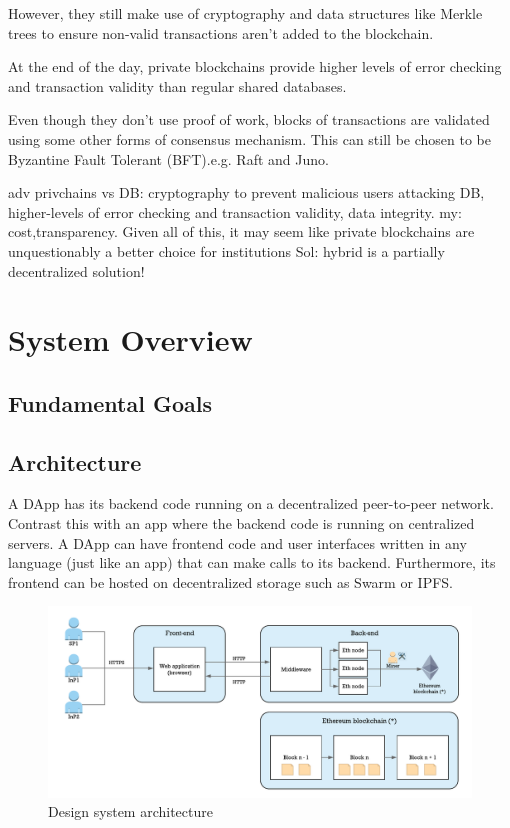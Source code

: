 However, they still make use of cryptography and data structures like Merkle trees to ensure non-valid transactions aren’t added to the blockchain. 

At the end of the day, private blockchains provide higher levels of error checking and transaction validity than regular shared databases. 

Even though they don’t use proof of work, blocks of transactions are validated using some other forms of consensus mechanism. This can still be chosen to be Byzantine Fault Tolerant (BFT).e.g. Raft and Juno.

adv privchains vs DB: cryptography to prevent malicious users attacking DB, higher-levels of error checking and transaction validity, data integrity.
my: cost,transparency.
Given all of this, it may seem like private blockchains are unquestionably a better choice for institutions
Sol: hybrid is a partially decentralized solution!
\section{System Overview}

\subsection{Fundamental Goals}

\subsection{Architecture}

A DApp has its backend code running on a decentralized peer-to-peer network. Contrast this with an app where the backend code is running on centralized servers. A DApp can have frontend code and user interfaces written in any language (just like an app) that can make calls to its backend. Furthermore, its frontend can be hosted on decentralized storage such as Swarm or IPFS.

\begin{figure}[bth]
	\centering
	\includegraphics[width=1\linewidth]{gfx/designWorkflow}    
  	\caption{Design system architecture}
  	\label{fig:designWorkflow}
\end{figure}


